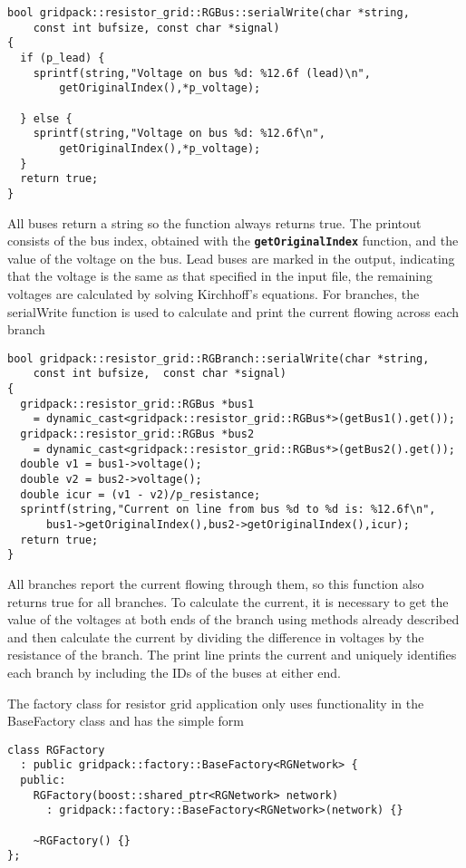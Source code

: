 {
\color{red}
\begin{Verbatim}[fontseries=b]
bool gridpack::resistor_grid::RGBus::serialWrite(char *string,
    const int bufsize, const char *signal)
{
  if (p_lead) {
    sprintf(string,"Voltage on bus %d: %12.6f (lead)\n",
        getOriginalIndex(),*p_voltage);

  } else {
    sprintf(string,"Voltage on bus %d: %12.6f\n",
        getOriginalIndex(),*p_voltage);
  }
  return true;
}
\end{Verbatim}
}

All buses return a string so the function always returns true. The printout
consists of the bus index, obtained with the \texttt{\textbf{getOriginalIndex}}
function, and the value of the voltage on the bus. Lead buses are marked in the
output, indicating that the voltage is the same as that specified in the input
file, the remaining voltages are calculated by solving Kirchhoff's equations. For branches, the serialWrite function is used to calculate and print the current flowing across each branch

{
\color{red}
\begin{Verbatim}[fontseries=b]
bool gridpack::resistor_grid::RGBranch::serialWrite(char *string,
    const int bufsize,  const char *signal)
{
  gridpack::resistor_grid::RGBus *bus1
    = dynamic_cast<gridpack::resistor_grid::RGBus*>(getBus1().get());
  gridpack::resistor_grid::RGBus *bus2
    = dynamic_cast<gridpack::resistor_grid::RGBus*>(getBus2().get());
  double v1 = bus1->voltage();
  double v2 = bus2->voltage();
  double icur = (v1 - v2)/p_resistance;
  sprintf(string,"Current on line from bus %d to %d is: %12.6f\n",
      bus1->getOriginalIndex(),bus2->getOriginalIndex(),icur);
  return true;
}
\end{Verbatim}
}

All branches report the current flowing through them, so this function also returns true for all branches. To calculate the current, it is necessary to get the value of the voltages at both ends of the branch using methods already described and then calculate the current by dividing the difference in voltages by the resistance of the branch. The print line prints the current and uniquely identifies each branch by including the IDs of the buses at either end.

The factory class for resistor grid application only uses functionality in the BaseFactory class and has the simple form

{
\color{red}
\begin{Verbatim}[fontseries=b]
class RGFactory
  : public gridpack::factory::BaseFactory<RGNetwork> {
  public:
    RGFactory(boost::shared_ptr<RGNetwork> network)
      : gridpack::factory::BaseFactory<RGNetwork>(network) {}

    ~RGFactory() {}
};
\end{Verbatim}
}

